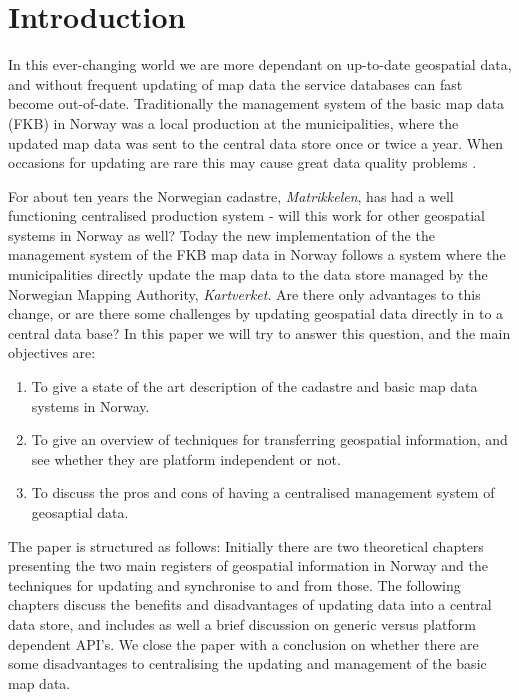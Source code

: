 

\chapter{Introduction}


In this ever-changing world we are more dependant on up-to-date geospatial data, and without frequent updating of map data the service databases can fast become out-of-date. Traditionally the management system of the basic map data (FKB) in Norway was a local production at the municipalities, where the updated map data was sent to the central data store once or twice a year. When occasions for updating are rare this may cause great data quality problems \citep{Lehto2015, Peng2005}. 

For about ten years the Norwegian cadastre, \textit{Matrikkelen}, has had a well functioning centralised production system \cite{Falkanger2017} - will this work for other geospatial systems in Norway as well? 
Today the new implementation of the the management system of the FKB map data in Norway follows a system where the municipalities directly update the map data to the data store managed by the Norwegian Mapping Authority, \textit{Kartverket}. Are there only advantages to this change, or are there some challenges by updating geospatial data directly in to a central data base?
In this paper we will try to answer this question, and the main objectives are:

\begin{enumerate}
\item To give a state of the art description of the cadastre and basic map data systems in Norway.
\item To give an overview of techniques for transferring geospatial information, and see whether they are platform independent or not.
\item To discuss the pros and cons of having a centralised management system of geosaptial data.
\end{enumerate}



The paper is structured as follows: Initially there are two theoretical chapters presenting the two main registers of geospatial information in Norway and the techniques for updating and synchronise to and from those. 
The following chapters discuss the benefits and disadvantages of updating data into a central data store, and includes as well a brief discussion on generic versus platform dependent API's. We close the paper with a conclusion on whether there are some disadvantages to centralising the updating and management of the basic map data.

